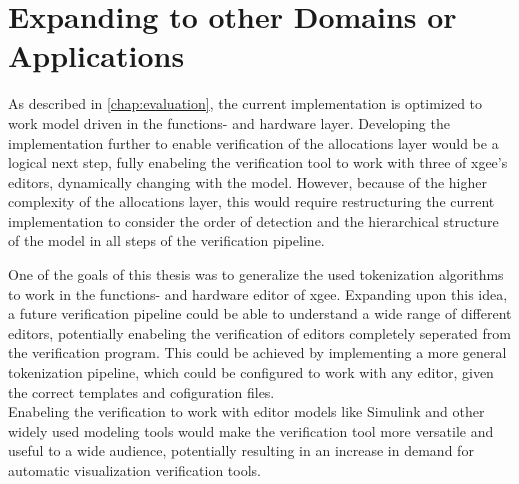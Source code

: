 \section{Expanding to other Domains or Applications}
\label{sec:expanding_to_other_domains}
As described in \autoref{chap:evaluation}, the current implementation is optimized to work model driven in the functions- and hardware layer. Developing the implementation further to enable verification of the allocations layer would be a logical next step, fully enabeling the verification tool to work with three of \acrshort{xgee}'s editors, dynamically changing with the model. However, because of the higher complexity of the allocations layer, this would require restructuring the current implementation to consider the order of detection and the hierarchical structure of the model in all steps of the verification pipeline.

One of the goals of this thesis was to generalize the used tokenization algorithms to work in the functions- and hardware editor of \acrshort{xgee}. Expanding upon this idea, a future verification pipeline could be able to understand a wide range of different editors, potentially enabeling the verification of editors completely seperated from the verification program. This could be achieved by implementing a more general tokenization pipeline, which could be configured to work with any editor, given the correct templates and cofiguration files.\\
Enabeling the verification to work with editor models like Simulink and other widely used modeling tools would make the verification tool more versatile and useful to a wide audience, potentially resulting in an increase in demand for automatic visualization verification tools.
